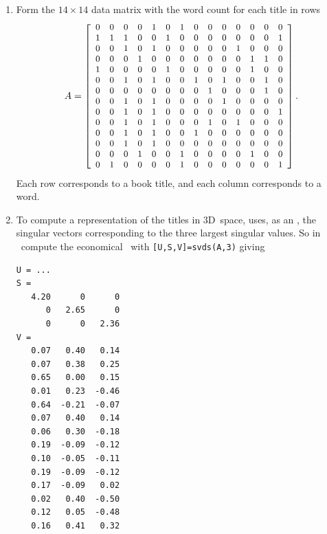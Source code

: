 \begin{enumerate}
\item Form the \(14\times14\) data matrix with the word count for each title in rows 
\begin{equation*}
A=\small\left[\begin{array}{*{14}c}
0&0&0&0&1&0&1&0&0&0&0&0&0&0 \\
1&1&1&0&0&1&0&0&0&0&0&0&0&1 \\
0&0&1&0&1&0&0&0&0&0&1&0&0&0 \\
0&0&0&1&0&0&0&0&0&0&0&1&1&0 \\
1&0&0&0&0&1&0&0&0&0&0&1&0&0 \\
0&0&1&0&1&0&0&1&0&1&0&0&1&0 \\
0&0&0&0&0&0&0&0&1&0&0&0&1&0 \\
0&0&1&0&1&0&0&0&0&1&0&0&0&0 \\
0&0&1&0&1&0&0&0&0&0&0&0&0&1 \\
0&0&1&0&1&0&0&0&1&0&1&0&0&0 \\
0&0&1&0&1&0&0&1&0&0&0&0&0&0 \\
0&0&1&0&1&0&0&0&0&0&0&0&0&0 \\
0&0&0&1&0&0&1&0&0&0&0&1&0&0 \\
0&1&0&0&0&0&1&0&0&0&0&0&0&1
\end{array}\right].
\end{equation*}
Each row corresponds to a book title, and each column corresponds to a word.
\setbox\ajrqrbox\hbox{}%
\marginajrbox%


\item To compute a representation of the titles in 3D~space,  uses, as an , the singular vectors corresponding to the three largest singular values.
So in \script\ compute the economical \svd\ with \verb|[U,S,V]=svds(A,3)| giving \twodp
\begin{verbatim}
U = ...
S =
   4.20      0      0
      0   2.65      0
      0      0   2.36
V =
   0.07   0.40   0.14
   0.07   0.38   0.25
   0.65   0.00   0.15
   0.01   0.23  -0.46
   0.64  -0.21  -0.07
   0.07   0.40   0.14
   0.06   0.30  -0.18
   0.19  -0.09  -0.12
   0.10  -0.05  -0.11
   0.19  -0.09  -0.12
   0.17  -0.09   0.02
   0.02   0.40  -0.50
   0.12   0.05  -0.48
   0.16   0.41   0.32
\end{verbatim}


\end{enumerate}
